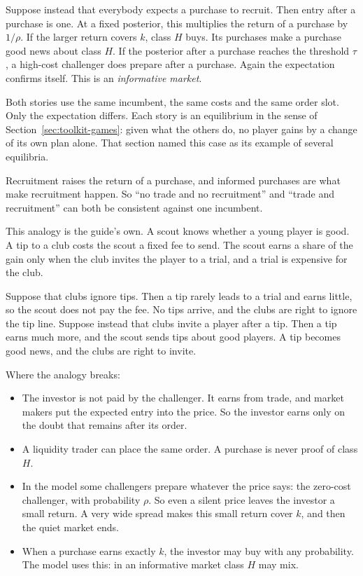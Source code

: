 Suppose instead that everybody expects a purchase to recruit. Then entry after a purchase is one. At a fixed
posterior, this multiplies the return of a purchase by \(1/\rho\). If the larger return covers \(k\), class \(H\)
buys. Its purchases make a purchase good news about class \(H\). If the posterior after a purchase reaches the
threshold \(\tau\), a high-cost challenger does prepare after a purchase. Again the expectation confirms itself.
This is an \emph{informative market}.

Both stories use the same incumbent, the same costs and the same order slot. Only the expectation differs. Each
story is an equilibrium in the sense of Section~\ref{sec:toolkit-games}: given what the others do, no player gains
by a change of its own plan alone. That section named this case as its example of several equilibria.

\begin{keyidea}
Recruitment raises the return of a purchase, and informed purchases are what make recruitment happen. So ``no
trade and no recruitment'' and ``trade and recruitment'' can both be consistent against one incumbent.
\end{keyidea}

\begin{analogy}
This analogy is the guide's own. A scout knows whether a young player is good. A tip to a club costs the scout a
fixed fee to send. The scout earns a share of the gain only when the club invites the player to a trial, and a trial
is expensive for the club.

Suppose that clubs ignore tips. Then a tip rarely leads to a trial and earns little, so the scout does not pay the
fee. No tips arrive, and the clubs are right to ignore the tip line. Suppose instead that clubs invite a player after
a tip. Then a tip earns much more, and the scout sends tips about good players. A tip becomes good news, and the
clubs are right to invite.

Where the analogy breaks:
\begin{itemize}
\item The investor is not paid by the challenger. It earns from trade, and market makers put the expected entry
into the price. So the investor earns only on the doubt that remains after its order.
\item A liquidity trader can place the same order. A purchase is never proof of class \(H\).
\item In the model some challengers prepare whatever the price says: the zero-cost challenger, with probability
\(\rho\). So even a silent price leaves the investor a small return. A very wide spread makes this small return
cover \(k\), and then the quiet market ends.
\item When a purchase earns exactly \(k\), the investor may buy with any probability. The model uses this: in an
informative market class \(H\) may mix.
\end{itemize}
\end{analogy}

